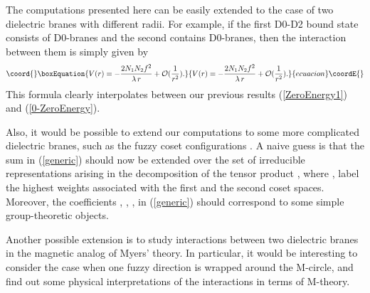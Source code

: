 \documentclass[a4paper,12pt]{article}
\begin{document}
{The computations presented here can be easily extended to the case of two dielectric branes with different radii. For example, if the first D0-D2 bound state consists of \coordHE{} D0-branes and the second contains \coordHE{} D0-branes, then the interaction between them is simply given by
\begin{equation}\coord{}\boxEquation{
V(r)=-\frac{2N_{1}N_{2}f^{2}}{\lambda\,r}+{\cal O}(\frac{1}{r^{2}}).
}{
V(r)=-\frac{2N_{1}N_{2}f^{2}}{\lambda\,r}+{\cal O}(\frac{1}{r^{2}}).
}{ecuacion}\coordE{}\end{equation}
This formula clearly interpolates between our previous results (\ref{ZeroEnergy1}) and (\ref{0-ZeroEnergy}).

Also, it would be possible to extend our computations to some more complicated dielectric branes, such as the fuzzy coset configurations \cite{TV}. A naive guess is that the sum in (\ref{generic}) should now be extended over the set of irreducible representations \coordHE{} arising in the decomposition of the tensor product \coordHE{}, where \coordHE{}, \coordHE{} label the highest weights associated with the first and the second coset spaces. Moreover, the coefficients \coordHE{}, \coordHE{}, \coordHE{}, \coordHE{} in (\ref{generic}) should correspond to some simple group-theoretic objects. 

Another possible extension is to study interactions between two dielectric branes in the magnetic analog \cite{DTV} of Myers' theory. In particular, it would be interesting to consider the case when one fuzzy direction is wrapped around the M-circle, and find out some physical interpretations of the interactions in terms of M-theory.
}
\end{document}
